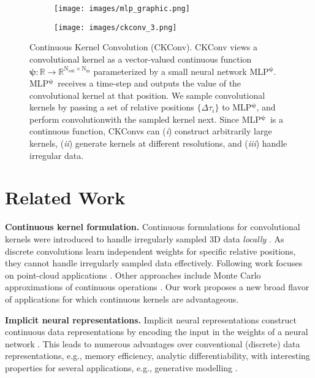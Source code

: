 \documentclass{article}
\def\sR{{\mathbb{R}}}
\def\sR{{\mathbb{R}}}
\def\bpsi{{\boldsymbol{\psi}}}
\newcommand{\mlp}{{\btt MLP}}
\newcommand{\mlppsi}{\mlp$^{\bpsi}$}
\begin{document}
\begin{figure}
    \centering
    \hfill
         \begin{subfigure}[b]{0.115\textwidth}
         \centering
         \texttt{[image: images/mlp\_graphic.png]}
\end{subfigure}
     \hfill
     \begin{subfigure}[b]{0.75\textwidth}
         \centering
         \texttt{[image: images/ckconv\_3.png]}
\end{subfigure}
     \hfill
    \vspace{-2mm}
    \caption{Continuous Kernel Convolution (CKConv). CKConv views a convolutional kernel as a vector-valued continuous function $\boldsymbol{\psi}: \sR \rightarrow \sR^{\mathrm{N_{out}}\times \mathrm{N_{in}}}$ parameterized by a small neural network \mlppsi. \mlppsi\ receives a time-step and outputs the value of the convolutional kernel at that position. We sample convolutional kernels by passing a set of relative positions $\{ \Delta\tau_i\}$ to \mlppsi, and perform convolution\break with the sampled kernel next. Since \mlppsi\ is a continuous function, CKConvs can (\textit{i}) construct arbitrarily large kernels, (\textit{ii}) generate kernels at different resolutions, and (\textit{iii}) handle irregular data.\vspace{-2.5mm}}
    \label{fig:ckconv}
\end{figure}
\vspace{-2mm}
\section{Related Work}\label{sec:related_work}
\vspace{-2mm}
\textbf{Continuous kernel formulation.} Continuous formulations for convolutional kernels were introduced to handle irregularly sampled 3D data \textit{locally} \citep{schutt2017schnet, simonovsky2017dynamic, wang2018deep, wu2019pointconv}. As discrete convolutions learn independent weights for specific relative positions, they cannot handle irregularly sampled data effectively. Following work focuses on point-cloud applications \citep{fuchs2020se, hu2020randla, shi2019points, thomas2018tensor}. Other approaches include Monte Carlo approximations of continuous operations \citep{finzi2020generalizing}.
Our work proposes a new broad flavor of applications for which continuous kernels are advantageous.

\textbf{Implicit neural representations.} Implicit neural representations construct continuous data representations by encoding the input in the weights of a neural network \citep{mescheder2019occupancy, park2019deepsdf, sitzmann2020implicit}. This leads to numerous advantages over conventional (discrete) data representations, e.g., memory efficiency, analytic differentiability, with interesting properties for several applications, e.g., generative modelling \citep{dupont2021generative, schwarz2020graf}.
\end{document}
